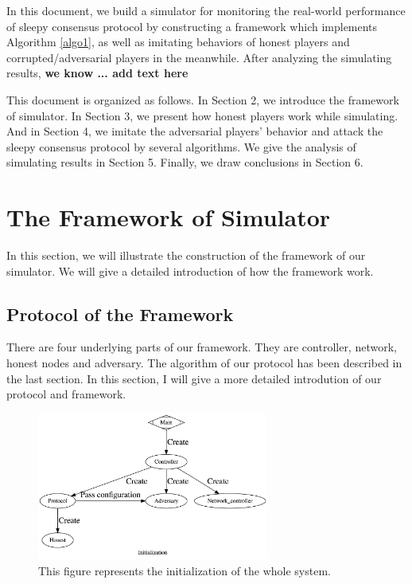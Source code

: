 \documentclass{llncs}
\begin{document}
In this document, we build a simulator for monitoring the real-world performance of sleepy consensus protocol by constructing a framework which implements Algorithm \ref{algo1}, as well as imitating behaviors of honest players and corrupted/adversarial players in the meanwhile. After analyzing the simulating results, \textbf{we know ... add text here}

This document is organized as follows. In Section 2, we introduce the framework of simulator. In Section 3, we present how honest players work while simulating. And in Section 4, we imitate the adversarial players' behavior and attack the sleepy consensus protocol by several algorithms. We give the analysis of simulating results in Section 5. Finally, we draw conclusions in Section 6.

\section{The Framework of Simulator}
%
\quad In this section, we will illustrate the construction of the framework of our simulator. We will give a detailed introduction of how the framework work. 

%
\subsection{Protocol of the Framework}

\quad There are four underlying parts of our framework. They are controller, network, honest nodes and adversary. The algorithm of our protocol has been 
described in the last section. In this section, I will give a more detailed introdution of our protocol and framework.

\vspace{-4mm}
\begin{figure}
	\centering
	\includegraphics[width=3.0in]{Figures/Initialization.jpg}
	\vspace{-3mm}
	\caption{This figure represents the initialization of the whole system.}
\end{figure}
\end{document}
